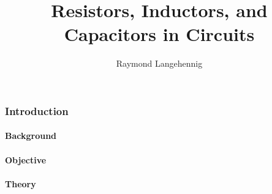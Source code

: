\documentclass{article}
\title{Resistors, Inductors, and Capacitors in Circuits}
\author{Raymond Langehennig}
\begin{document}
\maketitle

	\section{Introduction}
		\subsection{Background}

		\subsection{Objective}

		\subsection{Theory}

\part{}

\part{}
\end{document}
